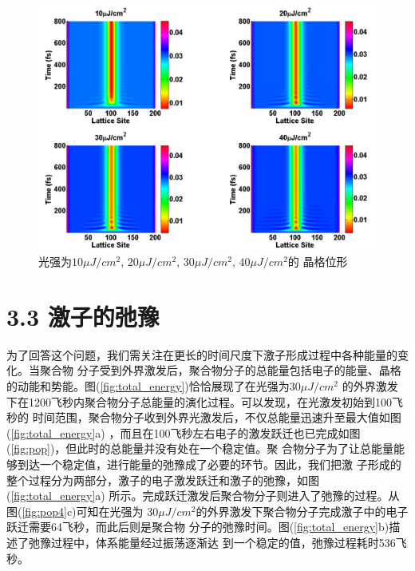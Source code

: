 \documentclass[12pt,]{report}
\begin{document}
\begin{figure}[h!] 
    \centering
    \includegraphics[scale=0.4]{./figures/Exciton_Figure_12.png}
    \caption{光强为$10\mu J/cm^2$, $20\mu J/cm^2$, $30\mu J/cm^2$, $40\mu J/cm^2$的
    晶格位形}
    \label{fig:l_config}
\end{figure}

\section{3.3 激子的弛豫}\label{ux6fc0ux5b50ux7684ux5f1bux8c6b}

为了回答这个问题，我们需关注在更长的时间尺度下激子形成过程中各种能量的变化。当聚合物
分子受到外界激发后，聚合物分子的总能量包括电子的能量、晶格的动能和势能。图(\ref{fig:total_energy})恰恰展现了在光强为\(30\mu J/cm^2\)
的外界激发下在1200飞秒内聚合物分子总能量的演化过程。可以发现，在光激发初始到100飞秒的
时间范围，聚合物分子收到外界光激发后，不仅总能量迅速升至最大值如图
(\ref{fig:total_energy}a) ，而且在100飞秒左右电子的激发跃迁也已完成如图
(\ref{fig:pop})，但此时的总能量并没有处在一个稳定值。聚
合物分子为了让总能量能够到达一个稳定值，进行能量的弛豫成了必要的环节。因此，我们把激
子形成的整个过程分为两部分，激子的电子激发跃迁和激子的弛豫，如图
(\ref{fig:total_energy}a)
所示。完成跃迁激发后聚合物分子则进入了弛豫的过程。从图(\ref{fig:pop4}c)可知在光强为
\(30\mu J/cm^2\)的外界激发下聚合物分子完成激子中的电子跃迁需要64飞秒，而此后则是聚合物
分子的弛豫时间。图(\ref{fig:total_energy}b)描述了弛豫过程中，体系能量经过振荡逐渐达
到一个稳定的值，弛豫过程耗时536飞秒。
\end{document}
